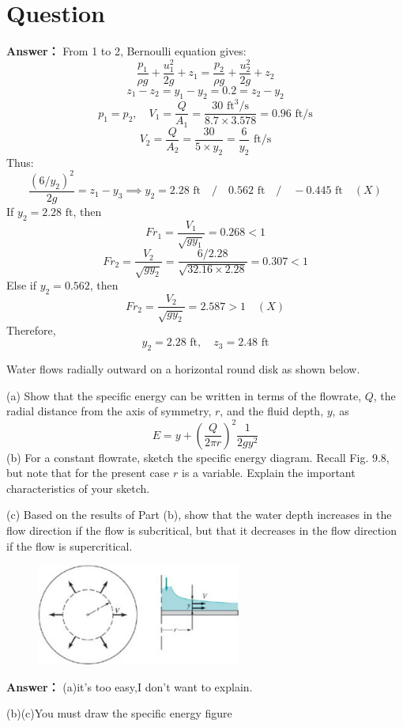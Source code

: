 \documentclass[12pt,a4paper]{article}
\newcounter{question}
\newenvironment{questions}{
    \setcounter{question}{0}
    \section*{Question}
    \begin{enumerate}[leftmargin=1.5em,label={\arabic*．}]
}{
    \end{enumerate}
}
\newcommand{\answer}[1]{\par\noindent\textbf{Answer：} #1\par\vspace{1em}}
\begin{document}
\begin{questions}
{\answer{
From 1 to 2, Bernoulli equation gives:
\[
\frac{p_1}{\rho g} + \frac{u_1^2}{2g} + z_1 = \frac{p_2}{\rho g} + \frac{u_2^2}{2g} + z_2
\]
\[
z_1 - z_2 = y_1 - y_2 = 0.2 = z_2 - y_2
\]
\[
p_1 = p_2, \quad V_1 = \frac{Q}{A_1} = \frac{30 \text{ ft}^3/\text{s}}{8.7 \times 3.578} = 0.96 \text{ ft/s}
\]
\[
V_2 = \frac{Q}{A_2} = \frac{30}{5 \times y_2} = \frac{6}{y_2} \text{ ft/s}
\]
Thus:
\[
\frac{(6/y_2)^2}{2g} = z_1 - y_3 \implies y_2 = 2.28 \text{ ft} \quad / \quad 0.562 \text{ ft} \quad / \quad -0.445 \text{ ft} \quad (X)
\]
If \( y_2 = 2.28 \text{ ft} \), then
\[
Fr_1 = \frac{V_1}{\sqrt{g y_1}} = 0.268 < 1
\]
\[
Fr_2 = \frac{V_2}{\sqrt{g y_2}} = \frac{6 / 2.28}{\sqrt{32.16 \times 2.28}} = 0.307 < 1
\]
Else if \( y_2 = 0.562 \), then
\[
Fr_2 = \frac{V_2}{\sqrt{g y_2}} = 2.587 > 1 \quad (X)
\]
Therefore,
\[
y_2 = 2.28 \text{ ft}, \quad z_3 = 2.48 \text{ ft}
\]

}


\item Water flows radially outward on a horizontal round disk as shown below.

(a) Show that the specific energy can be written in terms of the flowrate, \( Q \), the radial distance from the axis of symmetry, \( r \), and the fluid depth, \( y \), as
\[ E = y + \left( \frac{Q}{2\pi r} \right)^2 \frac{1}{2gy^2} \]
(b) For a constant flowrate, sketch the specific energy diagram. Recall Fig. 9.8, but note that for the present case \( r \) is a variable. Explain the important characteristics of your sketch.

(c) Based on the results of Part (b), show that the water depth increases in the flow direction if the flow is subcritical, but that it decreases in the flow direction if the flow is supercritical.

\begin{figure}[H]
\centering
\includegraphics[width=0.6\textwidth]{./figures/31.png}
\end{figure}

\answer{
(a)it's too easy,I don't want to explain.

(b)(c)You must draw the specific energy figure
}

}
\end{questions}
\end{document}
